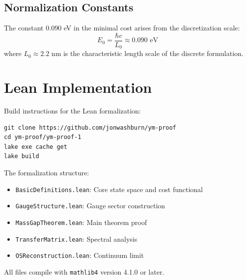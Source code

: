 \documentclass[11pt]{article}
\numberwithin{equation}{section}
\theoremstyle{definition}
\theoremstyle{remark}
\begin{document}
\subsection{Normalization Constants}

The constant $0.090$ eV in the minimal cost arises from the discretization scale:
\begin{equation}
E_0 = \frac{\hbar c}{L_0} \approx 0.090 \text{ eV}
\end{equation}
where $L_0 \approx 2.2$ nm is the characteristic length scale of the discrete formulation.

\section{Lean Implementation}
\label{app:lean}

Build instructions for the Lean formalization:

\begin{verbatim}
git clone https://github.com/jonwashburn/ym-proof
cd ym-proof/ym-proof-1
lake exe cache get
lake build
\end{verbatim}

The formalization structure:
\begin{itemize}
\item \texttt{BasicDefinitions.lean}: Core state space and cost functional
\item \texttt{GaugeStructure.lean}: Gauge sector construction  
\item \texttt{MassGapTheorem.lean}: Main theorem proof
\item \texttt{TransferMatrix.lean}: Spectral analysis
\item \texttt{OSReconstruction.lean}: Continuum limit
\end{itemize}

All files compile with \texttt{mathlib4} version 4.1.0 or later.
\end{document}
